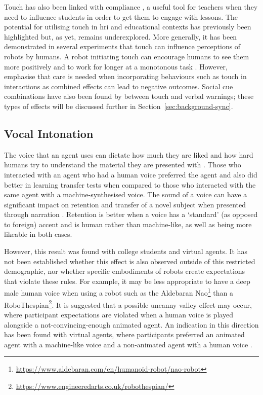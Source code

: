 Touch has also been linked with compliance \citep{gueguen2002touch}, a useful tool for teachers when they need to influence students in order to get them to engage with lessons. The potential for utilising touch in \acrshort{hri} and educational contexts has previously been highlighted \citep{salter2006learning} but, as yet, remains underexplored. More generally, it has been demonstrated in several experiments that touch can influence perceptions of robots by humans. A robot initiating touch can encourage humans to see them more positively and to work for longer at a monotonous task \citep{shiomi2016touch}. However, \cite{cramer2009hug} emphasise that care is needed when incorporating behaviours such as touch in interactions as combined effects can lead to negative outcomes. Social cue combinations have also been found by \cite{chen2011touched} between touch and verbal warnings; these types of effects will be discussed further in Section~\ref{sec:background-sync}.

\subsection{Vocal Intonation} \label{sec:background-voice}
The voice that an agent uses can dictate how much they are liked and how hard humans try to understand the material they are presented with \citep{atkinson2005fostering}. Those who interacted with an agent who had a human voice preferred the agent and also did better in learning transfer tests when compared to those who interacted with the same agent with a machine-synthesised voice. The sound of a voice can have a significant impact on retention and transfer of a novel subject when presented through narration \citep{mayer2003social}. Retention is better when a voice has a `standard' (as opposed to foreign) accent and is human rather than machine-like, as well as being more likeable in both cases.

However, this result was found with college students and virtual agents. It has not been established whether this effect is also observed outside of this restricted demographic, nor whether specific embodiments of robots create expectations that violate these rules. For example, it may be less appropriate to have a deep male human voice when using a robot such as the Aldebaran Nao\footnote{\href{https://www.aldebaran.com/en/humanoid-robot/nao-robot}{https://www.aldebaran.com/en/humanoid-robot/nao-robot}} than a RoboThespian\footnote{\href{https://www.engineeredarts.co.uk/robothespian/}{https://www.engineeredarts.co.uk/robothespian/}}. It is suggested that a possible uncanny valley effect \citep{moore2012bayesian,mori2012uncanny} may occur, where participant expectations are violated when a human voice is played alongside a not-convincing-enough animated agent. An indication in this direction has been found with virtual agents, where participants preferred an animated agent with a machine-like voice and a non-animated agent with a human voice \citep{baylor2003effects}.


